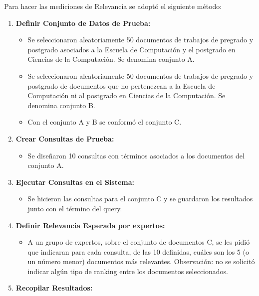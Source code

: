 \documentclass[
  12pt,
  openany]{book}
\providecommand{\tightlist}{%
  \setlength{\itemsep}{0pt}\setlength{\parskip}{0pt}}
\begin{document}
Para hacer las mediciones de Relevancia se adoptó el siguiente método:

\begin{enumerate}
\def\labelenumi{\arabic{enumi}.}
\tightlist
\item
  \textbf{Definir Conjunto de Datos de Prueba:}

  \begin{itemize}
  \tightlist
  \item
    Se seleccionaron aleatoriamente 50 documentos de trabajos de pregrado y postgrado asociados a la Escuela de Computación y el postgrado en Ciencias de la Computación. Se denomina conjunto A.
  \item
    Se seleccionaron aleatoriamente 50 documentos de trabajos de pregrado y postgrado de documentos que no pertenezcan a la Escuela de Computación ni al postgrado en Ciencias de la Computación. Se denomina conjunto B.
  \item
    Con el conjunto A y B se conformó el conjunto C.
  \end{itemize}
\item
  \textbf{Crear Consultas de Prueba:}

  \begin{itemize}
  \tightlist
  \item
    Se diseñaron 10 consultas con términos asociados a los documentos del conjunto A.
  \end{itemize}
\item
  \textbf{Ejecutar Consultas en el Sistema:}

  \begin{itemize}
  \tightlist
  \item
    Se hicieron las consultas para el conjunto C y se guardaron los resultados junto con el término del query.
  \end{itemize}
\item
  \textbf{Definir Relevancia Esperada por expertos:}

  \begin{itemize}
  \tightlist
  \item
    A un grupo de expertos, sobre el conjunto de documentos C, se les pidió que indicaran para cada consulta, de las 10 definidas, cuáles son los 5 (o un número menor) documentos más relevantes. Observación: no se solicitó indicar algún tipo de ranking entre los documentos seleccionados.
  \end{itemize}
\item
  \textbf{Recopilar Resultados:}


\end{enumerate}
\end{document}

